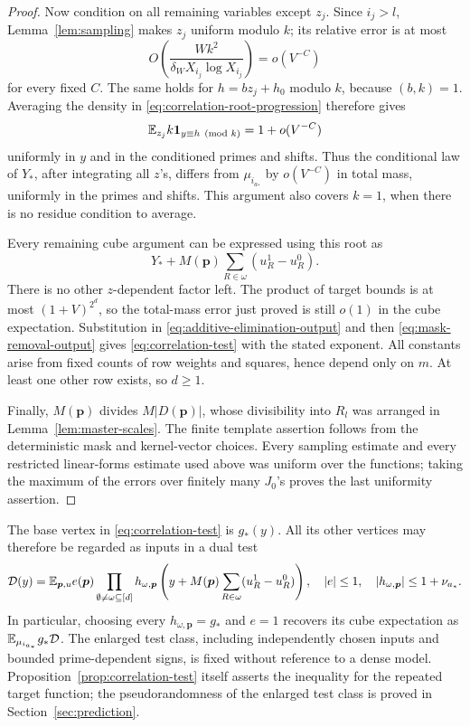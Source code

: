 \begin{proof}
Now condition on all remaining variables except $z_j$.
Since $i_j>l$, Lemma~\ref{lem:sampling} makes $z_j$ uniform modulo $k$;
its relative error is at most
\[
 O\left(\frac{Wk^2}{\delta_W X_{i_j}\log X_{i_j}}\right)=o(V^{-C})
\]
for every fixed $C$.
The same holds for $h=bz_j+h_0$ modulo $k$, because $(b,k)=1$.
Averaging the density in \eqref{eq:correlation-root-progression}
therefore gives
\[
 \mathbb E_{z_j} k\mathbf 1_{y\equiv h\pmod{k}}=1+o(V^{-C})
\]
uniformly in $y$ and in the conditioned primes and shifts.
Thus the conditional law of $Y_*$, after integrating all $z$'s, differs
from $\mu_{i_{a_*}}$ by $o(V^{-C})$ in total mass, uniformly in the
primes and shifts.  This argument also covers $k=1$, when there is no
residue condition to average.

Every remaining cube argument can be expressed using this root as
\[
 Y_*+M(\boldsymbol p)
                 \sum_{R\in\omega}(u_R^1-u_R^0).
\]
There is no other $z$-dependent factor left.  The product of target
bounds is at most $(1+V)^{2^d}$, so the total-mass error just proved is
still $o(1)$ in the cube expectation.  Substitution in
\eqref{eq:additive-elimination-output} and then
\eqref{eq:mask-removal-output} gives
\eqref{eq:correlation-test} with the stated exponent.  All constants
arise from fixed counts of row weights and squares, hence depend only
on $m$.  At least one other row exists, so $d\ge1$.

Finally, $M(\boldsymbol p)$ divides $M|D(\boldsymbol p)|$, whose
divisibility into $R_l$ was arranged in
Lemma~\ref{lem:master-scales}.  The finite template assertion follows
from the deterministic mask and kernel-vector choices.  Every
sampling estimate and every restricted linear-forms estimate used
above was uniform over the functions; taking the maximum of the errors
over finitely many $J_0$'s proves the last uniformity assertion.
\end{proof}

\begin{remark}
\label{rem:correlation-dual-interface}
The base vertex in \eqref{eq:correlation-test} is $g_*(y)$.
All its other vertices may therefore be regarded as inputs in a dual
test
\[
 \mathcal D(y)=\mathbb E_{\boldsymbol p,u}e(\boldsymbol p)
  \prod_{\emptyset\ne\omega\subseteq[d]}
  h_{\omega,\boldsymbol p}\left(y+M(\boldsymbol p)
              \sum_{R\in\omega}(u_R^1-u_R^0)\right),
 \quad |e|\le1,\quad |h_{\omega,\boldsymbol p}|\le1+\nu_{a_*}.
\]
In particular, choosing every $h_{\omega,\boldsymbol p}=g_*$ and
$e=1$ recovers its cube expectation as $\mathbb E_{\mu_{i_{a_*}}}g_*\mathcal D$.
The enlarged test class, including independently chosen inputs and
bounded prime-dependent signs, is fixed without reference to a dense
model.  Proposition~\ref{prop:correlation-test} itself asserts the
inequality for the repeated target function; the pseudorandomness of
the enlarged test class is proved in Section~\ref{sec:prediction}.
\end{remark}

